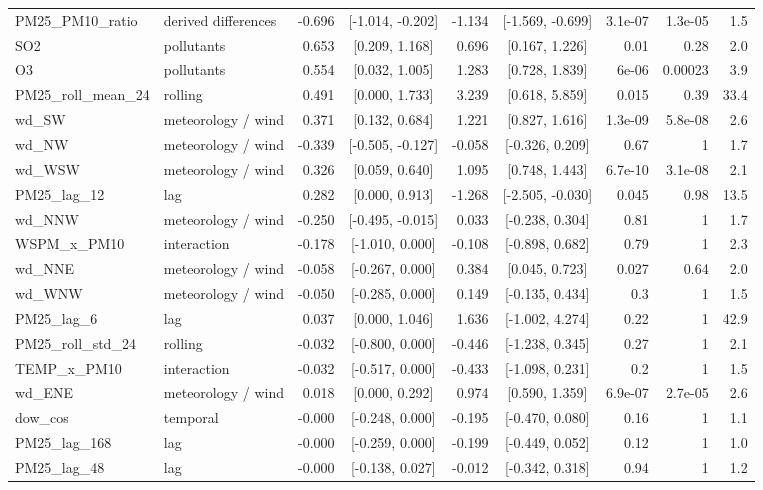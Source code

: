 \begin{table}[t]
\begin{tabular}{llrcrcrrr}
PM25\_PM10\_ratio & derived differences & -0.696 & [-1.014, -0.202] & -1.134 & [-1.569, -0.699] & 3.1e-07 & 1.3e-05 & 1.5 \\
SO2 & pollutants & 0.653 & [0.209, 1.168] & 0.696 & [0.167, 1.226] & 0.01 & 0.28 & 2.0 \\
O3 & pollutants & 0.554 & [0.032, 1.005] & 1.283 & [0.728, 1.839] & 6e-06 & 0.00023 & 3.9 \\
PM25\_roll\_mean\_24 & rolling & 0.491 & [0.000, 1.733] & 3.239 & [0.618, 5.859] & 0.015 & 0.39 & 33.4 \\
wd\_SW & meteorology / wind & 0.371 & [0.132, 0.684] & 1.221 & [0.827, 1.616] & 1.3e-09 & 5.8e-08 & 2.6 \\
wd\_NW & meteorology / wind & -0.339 & [-0.505, -0.127] & -0.058 & [-0.326, 0.209] & 0.67 & 1 & 1.7 \\
wd\_WSW & meteorology / wind & 0.326 & [0.059, 0.640] & 1.095 & [0.748, 1.443] & 6.7e-10 & 3.1e-08 & 2.1 \\
PM25\_lag\_12 & lag & 0.282 & [0.000, 0.913] & -1.268 & [-2.505, -0.030] & 0.045 & 0.98 & 13.5 \\
wd\_NNW & meteorology / wind & -0.250 & [-0.495, -0.015] & 0.033 & [-0.238, 0.304] & 0.81 & 1 & 1.7 \\
WSPM\_x\_PM10 & interaction & -0.178 & [-1.010, 0.000] & -0.108 & [-0.898, 0.682] & 0.79 & 1 & 2.3 \\
wd\_NNE & meteorology / wind & -0.058 & [-0.267, 0.000] & 0.384 & [0.045, 0.723] & 0.027 & 0.64 & 2.0 \\
wd\_WNW & meteorology / wind & -0.050 & [-0.285, 0.000] & 0.149 & [-0.135, 0.434] & 0.3 & 1 & 1.5 \\
PM25\_lag\_6 & lag & 0.037 & [0.000, 1.046] & 1.636 & [-1.002, 4.274] & 0.22 & 1 & 42.9 \\
PM25\_roll\_std\_24 & rolling & -0.032 & [-0.800, 0.000] & -0.446 & [-1.238, 0.345] & 0.27 & 1 & 2.1 \\
TEMP\_x\_PM10 & interaction & -0.032 & [-0.517, 0.000] & -0.433 & [-1.098, 0.231] & 0.2 & 1 & 1.5 \\
wd\_ENE & meteorology / wind & 0.018 & [0.000, 0.292] & 0.974 & [0.590, 1.359] & 6.9e-07 & 2.7e-05 & 2.6 \\
dow\_cos & temporal & -0.000 & [-0.248, 0.000] & -0.195 & [-0.470, 0.080] & 0.16 & 1 & 1.1 \\
PM25\_lag\_168 & lag & -0.000 & [-0.259, 0.000] & -0.199 & [-0.449, 0.052] & 0.12 & 1 & 1.0 \\
PM25\_lag\_48 & lag & -0.000 & [-0.138, 0.027] & -0.012 & [-0.342, 0.318] & 0.94 & 1 & 1.2 \\

\end{tabular}
\end{table}
